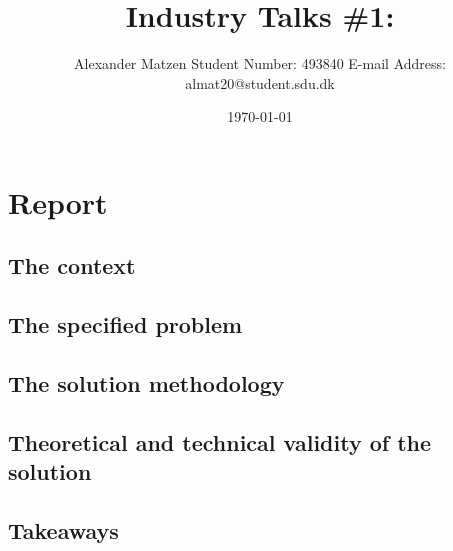 \documentclass[11pt]{article}
\begin{document}
\setlength\parindent{0pt}
\setlength{\parskip}{1em}
\pagestyle{empty}

\title{Industry Talks \#1: }
\author{Alexander Matzen \addvspace{1em} Student Number: 493840 \newline E-mail Address: almat20@student.sdu.dk}
\date{\today}


\pagecolor{white}

\section*{Report}

\subsection*{The context}



\subsection*{The specified problem}

\subsection*{The solution methodology}

\subsection*{Theoretical and technical validity of the solution}

\subsection*{Takeaways}
\end{document}
